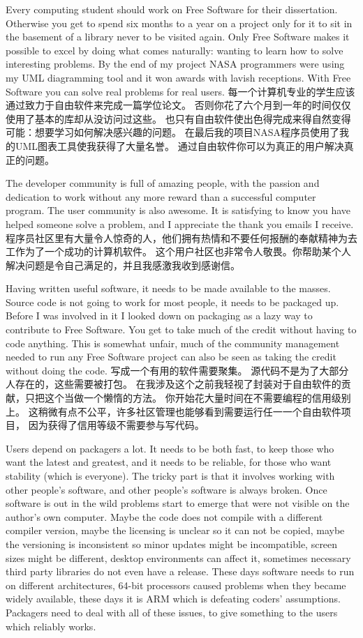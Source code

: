 Every computing student should work on Free Software for their dissertation.
Otherwise you get to spend six months to a year on a project only for it to sit
in the basement of a library never to be visited again. Only Free Software makes
it possible to excel by doing what comes naturally: wanting to learn how to
solve interesting problems. By the end of my project NASA programmers were using
my UML diagramming tool and it won awards with lavish receptions. With Free
Software you can solve real problems for real users.
每一个计算机专业的学生应该通过致力于自由软件来完成一篇学位论文。
否则你花了六个月到一年的时间仅仅使用了基本的库却从没访问过这些。
也只有自由软件使出色得完成来得自然变得可能：想要学习如何解决感兴趣的问题。
在最后我的项目NASA程序员使用了我的UML图表工具使我获得了大量名誉。
通过自由软件你可以为真正的用户解决真正的问题。

The developer community is full of amazing people, with the passion and
dedication to work without any more reward than a successful computer program.
The user community is also awesome. It is satisfying to know you have helped
someone solve a problem, and I appreciate the thank you emails I receive.
程序员社区里有大量令人惊奇的人，他们拥有热情和不要任何报酬的奉献精神为去工作为了一个成功的计算机软件。
这个用户社区也非常令人敬畏。你帮助某个人解决问题是令自己满足的，并且我感激我收到感谢信。

Having written useful software, it needs to be made available to the masses.
Source code is not going to work for most people, it needs to be packaged up.
Before I was involved in it I looked down on packaging as a lazy way to
contribute to Free Software. You get to take much of the credit without having
to code anything. This is somewhat unfair, much of the community management
needed to run any Free Software project can also be seen as taking the credit
without doing the code.
写成一个有用的软件需要聚集。
源代码不是为了大部分人存在的，这些需要被打包。
在我涉及这个之前我轻视了封装对于自由软件的贡献，只把这个当做一个懒惰的方法。
你开始花大量时间在不需要编程的信用级别上。
这稍微有点不公平，许多社区管理也能够看到需要运行任一一个自由软件项目，
因为获得了信用等级不需要参与写代码。

Users depend on packagers a lot. It needs to be both fast, to keep those who
want the latest and greatest, and it needs to be reliable, for those who want
stability (which is everyone). The tricky part is that it involves working with
other people’s software, and other people’s software is always broken. Once
software is out in the wild problems start to emerge that were not visible on
the author’s own computer. Maybe the code does not compile with a different
compiler version, maybe the licensing is unclear so it can not be copied, maybe
the versioning is inconsistent so minor updates might be incompatible, screen
sizes might be different, desktop environments can affect it, sometimes
necessary third party libraries do not even have a release. These days software
needs to run on different architectures, 64-bit processors caused problems when
they became widely available, these days it is ARM which is defeating coders’
assumptions. Packagers need to deal with all of these issues, to give something
to the users which reliably works.

